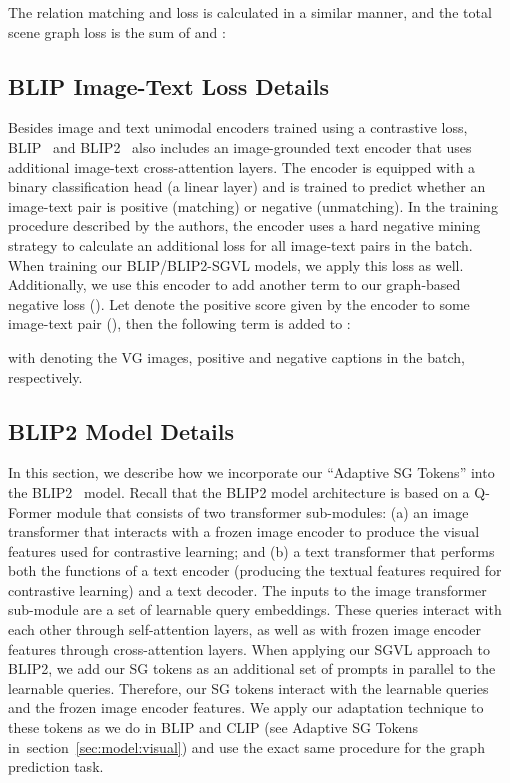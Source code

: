 \documentclass[11pt]{article}
\def\secref#1{section~\ref{#1}}
\begin{document}
\small

\normalsize
The relation matching and loss  is calculated in a similar manner, and the total scene graph loss is the sum of  and :






\subsection{BLIP Image-Text Loss Details} 
\label{supp:models:blip}
Besides image and text unimodal encoders trained using a contrastive loss,  BLIP~\cite{blip} and BLIP2~\cite{li2023blip2} also includes an image-grounded text encoder that uses additional image-text cross-attention layers. The encoder is equipped with a binary classification head (a linear layer) and is trained to predict whether an image-text pair is positive (matching) or negative (unmatching). In the training procedure described by the authors, the encoder uses a hard negative mining strategy to calculate an additional loss for all image-text pairs in the batch. When training our BLIP/BLIP2-SGVL models, we apply this loss as well. Additionally, we use this encoder to add another term to our graph-based negative loss (). Let  denote the positive score given by the encoder to some image-text pair (), then the following term is added to :

\small

\normalsize
with  denoting the VG images, positive and negative captions in the batch, respectively.



\subsection{BLIP2 Model Details}
\label{supp:models:blip2}
In this section, we describe how we incorporate our ``Adaptive SG Tokens'' into the BLIP2~\cite{li2023blip2} model. Recall that the BLIP2 model architecture is based on a Q-Former module that consists of two transformer sub-modules: (a) an image transformer that interacts with a frozen image encoder to produce the visual features used for contrastive learning; and (b) a text transformer that performs both the functions of a text encoder (producing the textual features required for contrastive learning) and a text decoder. The inputs to the image transformer sub-module are a set of learnable query embeddings. These queries interact with each other through self-attention layers, as well as with frozen image encoder features through cross-attention layers. When applying our SGVL approach to BLIP2, we add our SG tokens as an additional set of prompts in parallel to the learnable queries. Therefore, our SG tokens interact with the learnable queries and the frozen image encoder features. We apply our adaptation technique to these tokens as we do in BLIP and CLIP (see Adaptive SG Tokens in~\secref{sec:model:visual}) and use the exact same procedure for the graph prediction task.  
\end{document}
